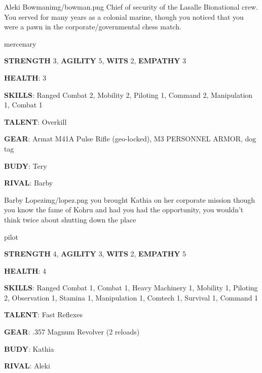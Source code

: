 


\begin{rpg-pcbox}{Aleki Bowman}{img/bowman.png}
    Chief of security of the Lasalle Bionational crew. You served for many years as a colonial marine, though you noticed that you were a pawn in the corporate/governmental chess match.
\end{rpg-pcbox}

\begin{rpg-commentbox}{}
    mercenary

    \textbf{STRENGTH} 3, \textbf{AGILITY} 5, \textbf{WITS} 2, \textbf{EMPATHY} 3

    \textbf{HEALTH}: 3

    \textbf{SKILLS}: Ranged Combat 2, Mobility 2, Piloting 1, Command 2, Manipulation 1, Combat 1
    
    \textbf{TALENT}: Overkill
    
    \textbf{GEAR}: Armat M41A Pulse Rifle (geo-locked), M3 PERSONNEL ARMOR, dog tag

    \textbf{BUDY}: Tery
    
    \textbf{RIVAL}: Barby
\end{rpg-commentbox}

\newsect

\begin{rpg-pcbox}{Barby Lopez}{img/lopez.png}
    you brought Kathia on her corporate mission though you know the fame of Kohru and had you had the opportunity, you wouldn't think twice about shutting down the place
\end{rpg-pcbox}

\begin{rpg-commentbox}{}
    pilot

    \textbf{STRENGTH} 4, \textbf{AGILITY} 3, \textbf{WITS} 2, \textbf{EMPATHY} 5

    \textbf{HEALTH}: 4

    \textbf{SKILLS}: Ranged Combat 1, Combat 1, Heavy Machinery 1, Mobility 1, Piloting 2, Observation 1, Stamina 1, Manipulation 1, Comtech 1, Survival 1, Command 1
    
    \textbf{TALENT}: Fast Reflexes
    
    \textbf{GEAR}: .357 Magnum Revolver (2 reloads)

    \textbf{BUDY}: Kathia
    
    \textbf{RIVAL}: Aleki
\end{rpg-commentbox}


\newsect

\medskip \medskip \medskip \medskip


